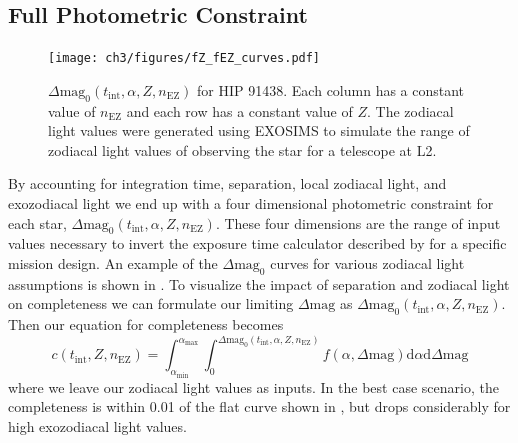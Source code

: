 
\subsection{Full Photometric Constraint}
\label{sub:full_comp}
\begin{figure}
  \begin{center}
    \texttt{[image: ch3/figures/fZ\_fEZ\_curves.pdf]}
  \end{center}
  \caption{$\Delta\textrm{mag}_0(t_\textrm{int}, \alpha, Z, n_\textrm{EZ})$ for HIP 91438.
    Each column has a constant value of $n_\textrm{EZ}$ and each row has a
    constant value of $Z$. The zodiacal light values were generated
    using EXOSIMS to simulate the range of zodiacal light values of observing
  the star for a telescope at L2.}
  \label{fig:fZ_fEZ_curves}
\end{figure}

By accounting for integration time, separation, local zodiacal light, and 
exozodiacal light we end up with a four dimensional photometric constraint for
each star, $\Delta\textrm{mag}_0(t_\textrm{int}, \alpha, Z,
n_\textrm{EZ})$. These four dimensions are the range of input values necessary
to invert the exposure time calculator described by \citet{Nemati2014} for a
specific mission design. An example of the $\Delta\textrm{mag}_0$ curves for
various zodiacal light assumptions is shown in . 
To visualize the impact of separation and zodiacal light on completeness
we can formulate our limiting $\Delta\textrm{mag}$ as 
$\Delta\textrm{mag}_0(t_\textrm{int}, \alpha, Z, n_\textrm{EZ})$.
Then our equation for completeness becomes
\begin{equation}
  c(t_\textrm{int}, Z, n_\textrm{EZ}) = 
  \int_{\alpha_\textrm{min}}^{\alpha_\textrm{max}} 
  \int_{0}^{\Delta\textrm{mag}_0(t_\textrm{int}, \alpha, Z, n_\textrm{EZ})}
  f(\alpha, \Delta\textrm{mag})\textrm{d}\alpha \textrm{d}\Delta\textrm{mag}
  \label{eq:comp_integral}
\end{equation}
where we leave our zodiacal light values as inputs. In the best case scenario,
the completeness is within 0.01 of the flat curve shown in
, but drops considerably for high exozodiacal
light values.

